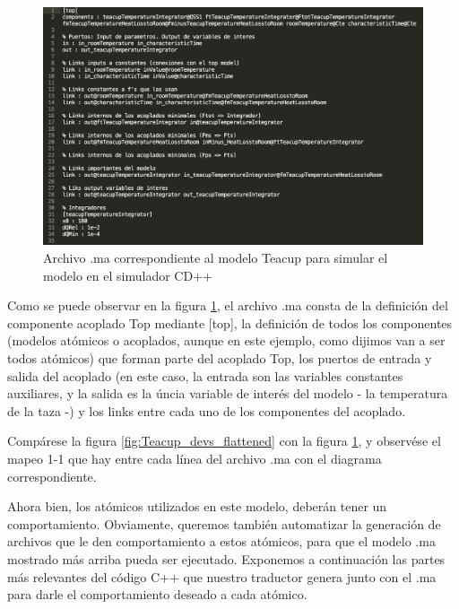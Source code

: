 \begin{figure}[!h]
\centering
\includegraphics[scale=0.5]{imagenes/teacup_mapeo/Teacup_ma}
\caption{Archivo .ma correspondiente al modelo Teacup para simular el modelo en el simulador CD++}
\label{fig:Teacup_ma}
\end{figure}

Como se puede observar en la figura \ref{fig:Teacup_ma}, el archivo .ma consta de la definición del componente acoplado Top mediante [top], la definición de todos los componentes (modelos atómicos o acoplados, aunque en este ejemplo, como dijimos van a ser todos atómicos) que forman parte del acoplado Top, los puertos de entrada y salida del acoplado (en este caso, la entrada son las variables constantes auxiliares, y la salida es la úncia variable de interés del modelo - la temperatura de la taza -) y los links entre cada uno de los componentes del acoplado.

Compárese la figura \ref{fig:Teacup_devs_flattened} con la figura \ref{fig:Teacup_ma}, y observése el mapeo 1-1 que hay entre cada línea del archivo .ma con el diagrama correspondiente.

Ahora bien, los atómicos utilizados en este modelo, deberán tener un comportamiento. Obviamente, queremos también automatizar la generación de archivos que le den comportamiento a estos atómicos, para que el modelo .ma mostrado más arriba pueda ser ejecutado. Exponemos a continuación las partes más relevantes del código C++ que nuestro traductor genera junto con el .ma para darle el comportamiento deseado a cada atómico.

